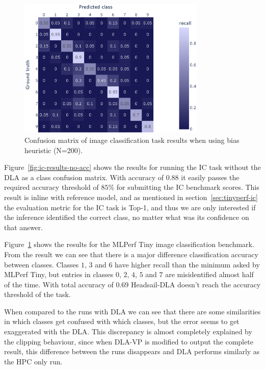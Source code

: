 \documentclass[12pt,a4paper,english
]{tunithesis}
\begin{document}
\begin{figure}[h]
  \centering
  \includegraphics[width=0.8\textwidth]{img/ic_200_abs_heuristic.eps}
  \caption{Confusion matrix of image classification task results when using bias heuristic (N=200).}
  \label{fig:ic-results}
\end{figure}


Figure~\ref{fig:ic-results-no-acc} shows the results for running the IC task without the DLA as a class confusion matrix. With accuracy of $0.88$ it easily passes the
required accuracy threshold of $85\%$ for submitting the IC benchmark scores. This result is inline with reference model, and as mentioned in section~\ref{sec:tinyperf-ic} the evaluation metric for the IC task is Top-1, and thus we are only interested if the inference identified the correct class, no matter what was its confidence on that answer.

Figure~\ref{fig:ic-results} shows the results for the MLPerf Tiny image classification benchmark. From the result we can see that there is a major difference classification accuracy between classes. Classes $1$, $3$ and $6$ have higher recall than the minimum asked by MLPerf Tiny, but entries in classes $0$, $2$, $4$, $5$ and $7$ are misidentified almost half of the time. With total accuracy of $0.69$ Headsail-DLA doesn't reach the accuracy threshold of the task.

When compared to the runs with DLA we can see that there are some similarities in which classes get confused with which classes, but the error seems to get exaggerated with the DLA.
This discrepancy is almost completely explained by the clipping behaviour, since when DLA-VP is modified to output the complete result, this difference between the runs disappears and DLA performs similarly as the HPC only run.
\end{document}
